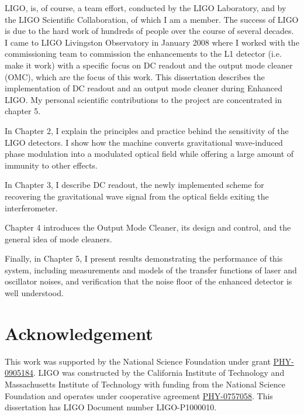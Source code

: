 LIGO, is, of course, a team effort, conducted by the LIGO Laboratory,
and by the LIGO Scientific Collaboration, of which I am a member.  The
success of LIGO is due to the hard work of hundreds of people over the
course of several decades.  I came to LIGO Livingston Observatory in
January 2008 where I worked with the commissioning team to commission
the enhancements to the L1 detector (i.e. make it work) with a
specific focus on DC readout and the output mode cleaner (OMC), which
are the focus of this work.  This dissertation describes the
implementation of DC readout and an output mode cleaner during
Enhanced LIGO.  My personal scientific contributions to the project
are concentrated in chapter 5.

In Chapter 2, I explain the principles and practice behind the
sensitivity of the LIGO detectors.  I show how the machine converts
gravitational wave-induced phase modulation into a modulated optical
field while offering a large amount of immunity to other effects.

In Chapter 3, I describe DC readout, the newly implemented scheme
for recovering the gravitational wave signal from the optical fields
exiting the interferometer.

Chapter 4 introduces the Output Mode Cleaner, its design and control,
and the general idea of mode cleaners.

Finally, in Chapter 5, I present results demonstrating the performance
of this system, including measurements and models of the transfer functions
of laser and oscillator noises, and verification that the noise floor
of the enhanced detector is well understood.


\section{Acknowledgement}

This work was supported by the National Science Foundation under grant
\href{http://www.nsf.gov/awardsearch/showAward.do?AwardNumber=0905184}{PHY-0905184}.
LIGO was constructed by the California Institute of Technology and
Massachusetts Institute of Technology with funding from the National
Science Foundation and operates under cooperative agreement
\href{http://www.nsf.gov/awardsearch/showAward.do?AwardNumber=0757058}{PHY-0757058}.
This dissertation has LIGO Document number LIGO-P1000010.
